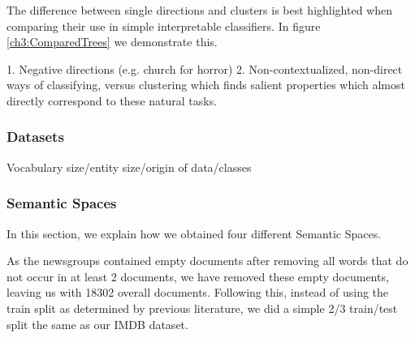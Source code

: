 The difference between single directions and clusters is best highlighted when comparing their use in simple interpretable classifiers. In figure \ref{ch3:ComparedTrees} we demonstrate this.

1. Negative directions (e.g. church for horror)
2. Non-contextualized, non-direct ways of classifying, versus clustering which finds salient properties which almost directly correspond to these natural tasks.



\subsubsection{Datasets}

Vocabulary size/entity size/origin of data/classes

\subsubsection{Semantic Spaces}
In this section, we explain how we obtained four different Semantic Spaces. \label{ch3:Method}

As the newsgroups contained empty documents after removing all words that do not occur in at least 2 documents, we have removed these empty documents, leaving us with 18302 overall documents. Following this, instead of using the train split as determined by previous literature, we did a simple 2/3 train/test split the same as our IMDB dataset.

